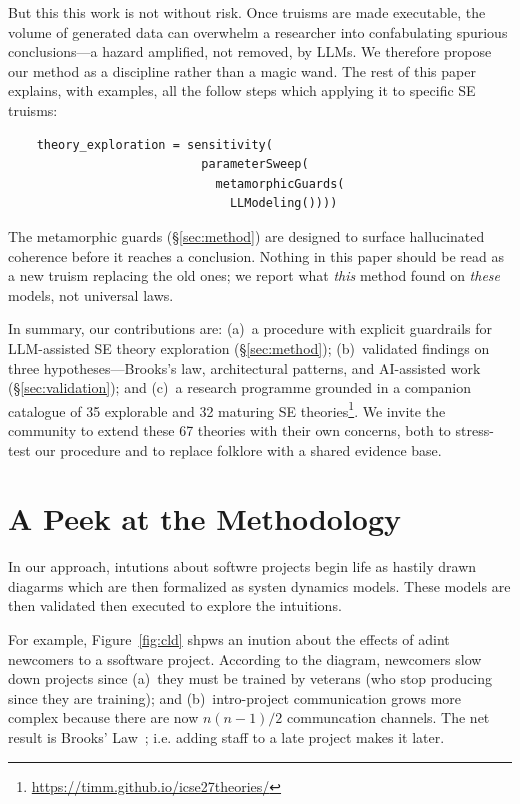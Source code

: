 \documentclass[10pt,conference]{IEEEtran}
\begin{document}
But this this work is not without risk. Once truisms are made executable,
the volume of generated data can overwhelm a researcher into
confabulating spurious conclusions---a hazard amplified, not
removed, by LLMs. We therefore
propose our method as a discipline rather than a magic wand. The
rest of this paper explains, with examples, all the follow steps
which applying it to specific SE truisms:

{\small \begin{verbatim}
    theory_exploration = sensitivity(
                           parameterSweep(
                             metamorphicGuards(
                               LLModeling())))\end{verbatim}}
The metamorphic guards (\S\ref{sec:method}) are designed to surface
hallucinated coherence before it reaches a conclusion. Nothing in
this paper should be read as a new truism replacing the old ones;
we report what \emph{this} method found on \emph{these} models, not
universal laws.

In summary, our contributions are:
(a)~a procedure with explicit guardrails for LLM-assisted SE
theory exploration (\S\ref{sec:method});
(b)~validated findings on three hypotheses---Brooks's law,
architectural patterns, and AI-assisted work
(\S\ref{sec:validation}); and (c)~a research programme grounded
in a companion catalogue of 35 explorable and 32 maturing SE
theories\footnote{\url{https://timm.github.io/icse27theories/}}.
We invite the community to extend these 67 theories with their own
concerns, both to stress-test our procedure and to replace folklore
with a shared evidence base.


\section{A Peek at the Methodology}
\label{sec:method-peek}

In our approach, intutions about softwre projects begin  life as hastily drawn
diagarms which are then formalized as systen dynamics models.
These models are then validated then executed to explore the intuitions.

For example, Figure~\ref{fig:cld} shpws an inution about the effects of adint newcomers
to a ssoftware project.
According to the diagram,
 newcomers slow down projects since (a)~they must be trained by veterans (who stop
  producing since they are training); and (b)~intro-project communication grows
  more complex because there are now $n(n-1)/2$ communcation channels.
The net result is Brooks' Law~\cite{brooks1975mmm}; i.e.
 adding staff to a late project makes it later.
\end{document}
